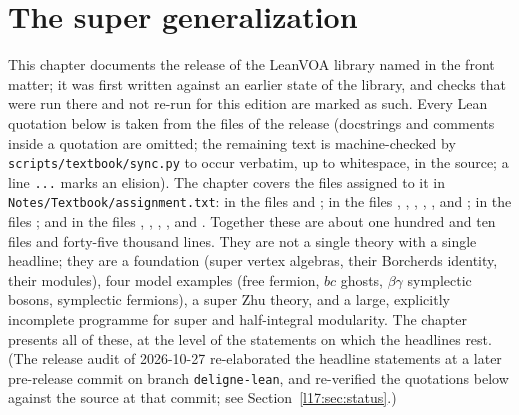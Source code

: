 \chapter{The super generalization}\label{ch:L17}
\begingroup\setlength{\emergencystretch}{8em}

\providecommand{\lseventeenvac}{\mathbf{1}}
\providecommand{\lseventeenV}{\mathcal{V}}
\providecommand{\lseventeeneps}{\varepsilon}
\providecommand{\lseventeenpar}[1]{|#1|}
\providecommand{\lseventeenGt}{\Gamma_\theta}
\providecommand{\lseventeenstr}{\operatorname{str}}

This chapter documents the release of the LeanVOA library named in the front matter; it was first written against an earlier state of the library, and checks that were run
there and not re-run for this edition are marked as such. Every Lean quotation below is taken from the files of the release (docstrings
and comments inside a quotation are omitted; the remaining text is machine-checked by
\texttt{scripts/textbook/sync.py} to occur verbatim, up to whitespace, in the source; a line
\texttt{...} marks an elision). The chapter covers the files assigned to it in
\texttt{Notes/Textbook/assignment.txt}: in  the files
 and ; in  the files
, , ,
, ,  and
; in  the files
; and in  the files ,
, ,
,  and
. Together these are about one hundred and ten files and forty-five
thousand lines. They are not a single theory with a single headline; they are a foundation (super
vertex algebras, their Borcherds identity, their modules), four model examples (free fermion, $bc$
ghosts, $\beta\gamma$ symplectic bosons, symplectic fermions), a super Zhu theory, and a large,
explicitly incomplete programme for super and half-integral modularity. The chapter presents all of
these, at the level of the statements on which the headlines rest. (The release audit of 2026-10-27 re-elaborated the
headline statements at a later pre-release commit on branch \texttt{deligne-lean}, and re-verified the quotations below
against the source at that commit; see Section~\ref{l17:sec:status}.)


